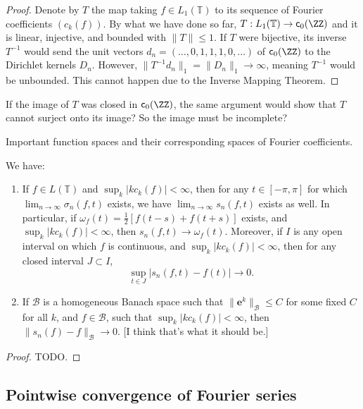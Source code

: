 \begin{proof}
Denote by $T$ the map taking $f \in L_1(\mathbb{T})$ to its sequence of Fourier coefficients $(c_k(f))$. By what we have done so far, $T : L_1(\mathbb{T}) \to \mathsf{c}_0(\ZZ)$ and it is linear, injective, and bounded with $\| T \| \leq 1$. If $T$ were bijective, its inverse $T^{-1}$ would send the unit vectors $d_n = (\ldots,0,1,1,1,0,\ldots)$ of $\mathsf{c}_0(\ZZ)$ to the Dirichlet kernels $D_n$. However, $\| T^{-1}d_n \|_1 = \| D_n \|_1 \to \infty$, meaning $T^{-1}$ would be unbounded. This cannot happen due to the Inverse Mapping Theorem.
\end{proof}

{\color{red}If the image of $T$ was closed in $\mathsf{c}_0(\ZZ)$, the same argument would show that $T$ cannot surject onto its image? So the image must be incomplete?}

\begin{remark}
Important function spaces and their corresponding spaces of Fourier coefficients.
\end{remark}

\begin{theorem}
We have:
\begin{enumerate}
\item If $f \in L(\mathbb{T})$ and $\sup_k |kc_k(f)| < \infty$, then for any $t \in [-\pi,\pi]$ for which $\lim_{n \to \infty} \sigma_n(f,t)$ exists, we have $\lim_{n \to \infty} s_n(f,t)$ exists as well. In particular, if $\omega_f(t) = \tfrac{1}{2}[f(t-s)+f(t+s)]$ exists, and $\sup_k |k c_k(f)| < \infty$, then $s_n(f,t) \to \omega_f(t)$. Moreover, if $I$ is any open interval on which $f$ is continuous, and $\sup_k |k c_k(f)| < \infty$, then for any closed interval $J \subset I$,
\[ \sup_{t \in J} |s_n(f,t) - f(t)| \to 0. \]
\item If $\mathcal{B}$ is a homogeneous Banach space such that $\| \mathbf{e}^k \|_{\mathcal B} \leq C$ for some fixed $C$ for all $k$, and $f \in \mathcal{B}$, such that $\sup_k |k c_k(f)| < \infty$, then $\| s_n(f) - f \|_{\mathcal{B}} \to 0$. [I think that's what it should be.]
\end{enumerate}
\end{theorem}

\begin{proof}
TODO.
\end{proof}

\subsection{Pointwise convergence of Fourier series}

